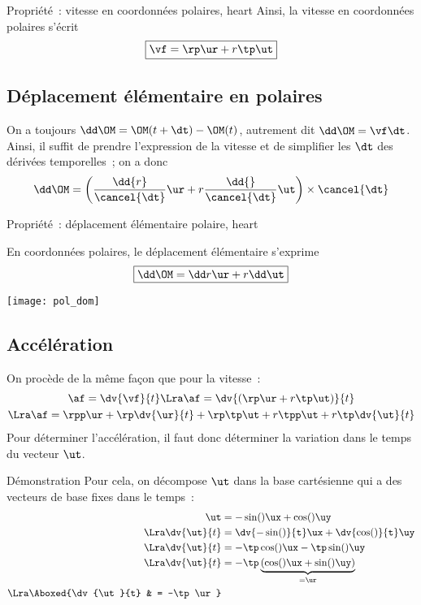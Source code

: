 \documentclass[../main/main.tex]{subfiles}
\begin{document}
\begin{tprop}{Propriété~: vitesse en coordonnées polaires, heart}
	Ainsi, la vitesse en coordonnées polaires s'écrit
	\[\boxed{\vf = \rp\ur + r\tp\ut}\]
\end{tprop}

\subsection{Déplacement élémentaire en polaires}
On a toujours $\dd\OM = \OM(t+\dt) - \OM(t)$, autrement dit $\dd\OM = \vf\dt$.
Ainsi, il suffit de prendre l'expression de la vitesse et de simplifier les
$\dt$ des dérivées temporelles~; on a donc
\begin{gather*}
	\dd\OM = \left(\frac{\dd{r}}{\cancel{\dt}}\ur + r
	\frac{\dd{\tt}}{\cancel{\dt}}\ut\right)\times\cancel{\dt}
\end{gather*}

\begin{tprop}{Propriété~: déplacement élémentaire polaire, heart}
	\begin{minipage}{0.70\linewidth}
		En coordonnées polaires, le déplacement élémentaire s'exprime
		\[\boxed{\dd\OM = \dd r\ur + r\dd\tt\ut}\]
	\end{minipage}
	\hfill
	\begin{minipage}{0.25\linewidth}
		\begin{center}
			\texttt{[image: pol\_dom]}
		\end{center}
	\end{minipage}
\end{tprop}

\subsection{Accélération}
On procède de la même façon que pour la vitesse~:
\begin{gather*}
	\af = \dv{\vf}{t}
	\Lra
	\af = \dv{\left(\rp\ur + r\tp\ut\right)}{t}
	\\\Lra
	\af = \rpp\ur + \rp \dv{\ur}{t} + \rp\tp\ut + r\tpp\ut + r\tp \dv{\ut}{t}
\end{gather*}
Pour déterminer l'accélération, il faut donc déterminer la variation dans le
temps du vecteur $\ut$.

\begin{rdemo}{Démonstration}
	Pour cela, on décompose $\ut$ dans la base cartésienne qui a des
	vecteurs de base fixes dans le temps~:
	\begin{align*}
		\ut                 & = -\sin(\tt)\ux + \cos(\tt)\uy
		\\\Lra
		\dv{\ut}{t}         & = \dv{-\sin(\tt)}{t}\ux + \dv{\cos(\tt)}{t}\uy
		\\\Lra
		\dv{\ut}{t}         & = -\tp\cos(\tt)\ux - \tp\sin(\tt)\uy
		\\\Lra
		\dv{\ut}{t}         & = -\tp
		\underbrace{\left(\cos(\tt)\ux + \sin(\tt)\uy\right)}_{= \ur}
		\\\Lra
		\Aboxed{\dv{\ut}{t} & = -\tp\ur}
	\end{align*}
\end{rdemo}
\end{document}
